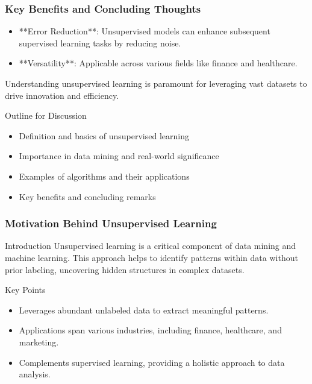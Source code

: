 \documentclass[aspectratio=169]{beamer}
\begin{document}
\begin{frame}[fragile]
  \frametitle{Key Benefits and Concluding Thoughts}
  
  \begin{itemize}
    \item **Error Reduction**: Unsupervised models can enhance subsequent supervised learning tasks by reducing noise.
    \item **Versatility**: Applicable across various fields like finance and healthcare.
  \end{itemize}
  
  Understanding unsupervised learning is paramount for leveraging vast datasets to drive innovation and efficiency.

  \begin{block}{Outline for Discussion}
    \begin{itemize}
      \item Definition and basics of unsupervised learning
      \item Importance in data mining and real-world significance
      \item Examples of algorithms and their applications
      \item Key benefits and concluding remarks
    \end{itemize}
  \end{block}

\end{frame}

\begin{frame}[fragile]
    \frametitle{Motivation Behind Unsupervised Learning}
    \begin{block}{Introduction}
        Unsupervised learning is a critical component of data mining and machine learning. This approach helps to identify patterns within data without prior labeling, uncovering hidden structures in complex datasets.
    \end{block}
    \begin{block}{Key Points}
        \begin{itemize}
            \item Leverages abundant unlabeled data to extract meaningful patterns.
            \item Applications span various industries, including finance, healthcare, and marketing.
            \item Complements supervised learning, providing a holistic approach to data analysis.
        \end{itemize}
    \end{block}
\end{frame}
\end{document}
